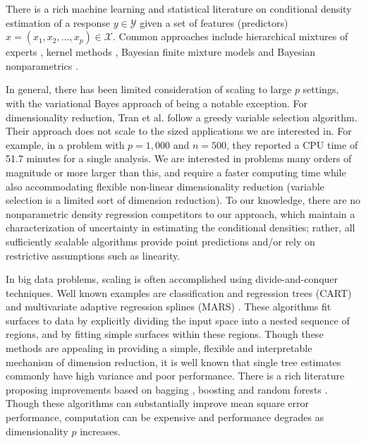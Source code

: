 \documentclass{article} %
\begin{document}
There is a rich machine learning and statistical literature on conditional density estimation of a response $y \in \mathcal{Y}$ given a set of features (predictors) $x=(x_1, x_2, \ldots, x_p)\in \mathcal{X}$. Common approaches include hierarchical mixtures of experts \cite{mixtureexperts,jiang1999}, kernel methods \cite{fan1996,fanyim2004,holmes2010,fu2011}, Bayesian finite mixture models \cite{nott2012,tran2012,norets2012} and Bayesian nonparametrics 
\cite{griffin06, dunson2007, DunsonPark, chung2009, tokdar2010}.  

In general, there has been limited consideration of scaling to large $p$ settings, with the variational Bayes approach of \cite{tran2012} being a notable exception. For dimensionality reduction, Tran et al. follow a greedy variable selection algorithm.  Their approach does not scale to the sized applications we are interested in. For example, in a problem with $p=1,000$ and $n=500$, they reported a CPU time of 51.7 minutes for a single analysis.  We are interested in problems many orders of magnitude or more larger than this, and require a faster computing time while also accommodating flexible non-linear dimensionality reduction (variable selection is a limited sort of dimension reduction).  To our knowledge, there are no nonparametric density regression competitors to our approach, which maintain a characterization of uncertainty in estimating the conditional densities; rather, all sufficiently scalable algorithms provide point predictions and/or rely on restrictive assumptions such as linearity.  

In big data problems, scaling is often accomplished using divide-and-conquer techniques. Well known examples are classification and regression trees (CART) \cite{CART} and multivariate adaptive regression splines (MARS) \cite{MARS}. These algorithms fit surfaces to data by explicitly dividing the input space into a nested sequence of regions, and by fitting simple surfaces  within these regions. Though these methods are appealing in providing a simple, flexible and interpretable mechanism of dimension reduction, it is well known that single tree estimates commonly have high variance and poor performance.  There is a rich literature proposing improvements based on bagging \cite{Bagging}, boosting \cite{Boosting} and random forests \cite{RandomForest}. Though these algorithms can substantially improve mean square error performance, computation can be expensive and performance degrades as dimensionality $p$ increases.
\end{document}
